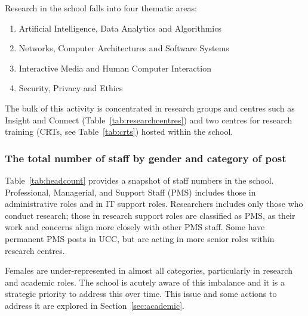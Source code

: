 

Research in the school falls into four thematic areas:
\begin{enumerate}[noitemsep]
    \item Artificial Intelligence, Data Analytics and Algorithmics
    \item Networks, Computer Architectures and Software Systems 
    \item Interactive Media and Human Computer Interaction
    \item Security, Privacy and Ethics
\end{enumerate}

The bulk of this activity is concentrated in  research groups 
and centres such as Insight 
and Connect 
(Table~\ref{tab:researchcentres}) 
and two centres for research 
training (CRTs, see  Table~\ref{tab:crts})
hosted within the school. 


\vspace{-4mm}



\subsubsection{The total number of staff by gender and category of post}

Table~\ref{tab:headcount} provides a snapshot of staff numbers 
in the school. Professional, Managerial, and Support Staff (PMS) 
includes those in administrative roles and in IT support roles.
Researchers includes only those who conduct research; those in
research support roles are classified as PMS, as their work and
concerns align more  closely with other PMS staff. Some
have permanent PMS posts in UCC, but are acting in more senior 
roles within research centres.



% 


Females are under-represented in almost all categories, particularly 
in research and  academic roles. 
The school is acutely aware of this imbalance  and it is a strategic 
priority to address this over time.
This issue and some actions to address it  are explored in Section~\ref{sec:academic}.


